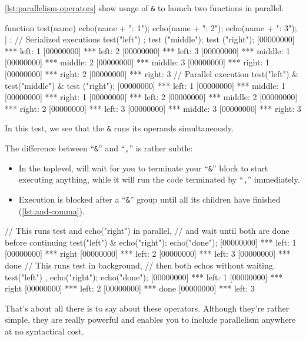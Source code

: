 \documentclass[openright,twoside,12pt]{report}
\begin{document}
\autoref{lst:parallelism-operators} show usage of \texttt{\&} to launch two
functions in parallel.

\begin{urbiscript}[caption=Parallelism operator,
  label=lst:parallelism-operators, name=parallel]
function test(name)
{
  echo(name + ": 1");
  echo(name + ": 2");
  echo(name + ": 3");
} | {};
// Serialized executions
test("left") ; test ("middle"); test ("right");
[00000000] *** left: 1
[00000000] *** left: 2
[00000000] *** left: 3
[00000000] *** middle: 1
[00000000] *** middle: 2
[00000000] *** middle: 3
[00000000] *** right: 1
[00000000] *** right: 2
[00000000] *** right: 3
// Parallel execution
test("left") & test("middle") & test ("right");
[00000000] *** left: 1
[00000000] *** middle: 1
[00000000] *** right: 1
[00000000] *** left: 2
[00000000] *** middle: 2
[00000000] *** right: 2
[00000000] *** left: 3
[00000000] *** middle: 3
[00000000] *** right: 3
\end{urbiscript}

In this test, we see that the \texttt{\&} runs its operands
simultaneously.

The difference between ``\texttt{\&}'' and ``\texttt{,}'' is rather
subtle:

\begin{itemize}
\item In the toplevel, will wait for you to terminate your
  ``\texttt{\&}'' block to start executing anything, while it will run
  the code terminated by ``\texttt{,}'' immediately.
\item Execution is blocked after a ``\texttt{\&}'' group until all its
  children have finished (\autoref{lst:and-comma}).
\end{itemize}

\begin{urbiscript}[caption=Difference between ``\texttt{\&}'' and
``\texttt{,}'', label=lst:and-comma, name=parallel]
// This runs test and echo("right") in parallel,
// and wait until both are done before continuing
test("left") & echo("right"); echo("done");
[00000000] *** left: 1
[00000000] *** right
[00000000] *** left: 2
[00000000] *** left: 3
[00000000] *** done
// This runs test in background,
// then both echos without waiting.
test("left") , echo("right"); echo("done");
[00000000] *** left: 1
[00000000] *** right
[00000000] *** left: 2
[00000000] *** done
[00000000] *** left: 3
\end{urbiscript}

That's about all there is to say about these operators. Although
they're rather simple, they are really powerful and enables you to
include parallelism anywhere at no syntactical cost.
\end{document}
